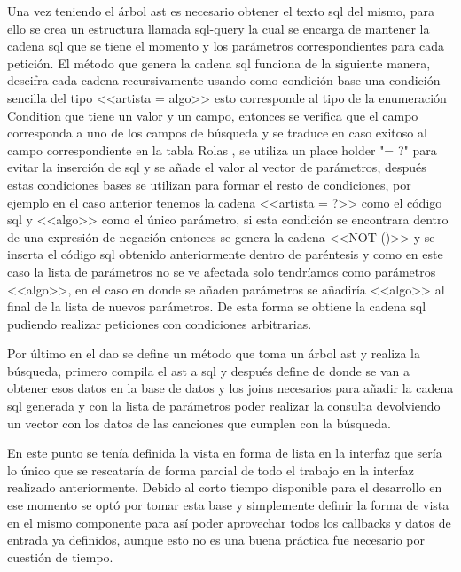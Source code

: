 \documentclass[12pt,a4paper]{article}
\begin{document}
Una vez teniendo el árbol ast es necesario obtener el texto sql del mismo, para ello se crea un estructura llamada sql-query la cual
se encarga de mantener la cadena sql que se tiene el momento y los parámetros correspondientes para cada petición. El método 
que genera la cadena sql funciona de la siguiente manera, descifra cada cadena recursivamente usando como condición base 
una condición sencilla del tipo <<artista = algo>> esto corresponde al tipo de la enumeración Condition que tiene un valor y un campo, entonces
se verifica que el campo corresponda a uno de los campos de búsqueda y se traduce en caso exitoso al campo correspondiente en la tabla Rolas
, se utiliza un place holder "= ?" para evitar la inserción de sql y se añade el valor al vector de parámetros, después estas condiciones bases 
se utilizan para formar el resto de condiciones, por ejemplo en el caso anterior tenemos la cadena <<artista = ?>> como el código sql y <<algo>> como
el único parámetro, si esta condición se encontrara dentro de una expresión de negación entonces se genera la cadena <<NOT ()>> y se inserta el código
sql obtenido anteriormente dentro de paréntesis y como en este caso la lista de parámetros no se ve afectada solo tendríamos como parámetros <<algo>>, en
el caso en donde se añaden parámetros se añadiría <<algo>> al final de la lista de nuevos parámetros. De esta forma se obtiene la cadena sql
pudiendo realizar peticiones con condiciones arbitrarias.

Por último en el dao se define un método que toma un árbol ast y realiza la búsqueda, primero compila el ast a sql y después define de donde 
se van a obtener esos datos en la base de datos y los joins necesarios para añadir la cadena sql generada y con la lista de parámetros poder realizar
la consulta devolviendo un vector con los datos de las canciones que cumplen con la búsqueda.

En este punto se tenía definida la vista en forma de lista en la interfaz que sería lo único que se rescataría 
de forma parcial de todo el trabajo en la interfaz realizado anteriormente. Debido al corto tiempo disponible 
para el desarrollo en ese momento se optó por tomar esta base y simplemente definir la forma de vista en el mismo 
componente para así poder aprovechar todos los callbacks y datos de entrada ya definidos, aunque esto no es una
buena práctica fue necesario por cuestión de tiempo.
\end{document}
